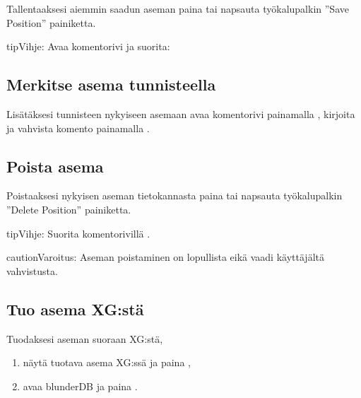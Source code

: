 \documentclass[letterpaper,10pt,finnish]{sphinxmanual}
\begin{document}
\sphinxAtStartPar
Tallentaaksesi aiemmin saadun aseman paina  tai napsauta työkalupalkin ”Save Position” \sphinxhyphen{}painiketta.

\begin{sphinxadmonition}{tip}{Vihje:}
\sphinxAtStartPar
Avaa komentorivi ja suorita: 
\end{sphinxadmonition}


\subsection{Merkitse asema tunnisteella}
\label{\detokenize{guide_utilisateur:etiqueter-une-position}}
\sphinxAtStartPar
Lisätäksesi tunnisteen  nykyiseen asemaan avaa komentorivi painamalla , kirjoita  ja vahvista komento painamalla .


\subsection{Poista asema}
\label{\detokenize{guide_utilisateur:supprimer-une-position}}
\sphinxAtStartPar
Poistaaksesi nykyisen aseman tietokannasta paina  tai napsauta työkalupalkin ”Delete Position” \sphinxhyphen{}painiketta.

\begin{sphinxadmonition}{tip}{Vihje:}
\sphinxAtStartPar
Suorita komentorivillä .
\end{sphinxadmonition}

\begin{sphinxadmonition}{caution}{Varoitus:}
\sphinxAtStartPar
Aseman poistaminen on lopullista eikä vaadi käyttäjältä vahvistusta.
\end{sphinxadmonition}


\subsection{Tuo asema XG:stä}
\label{\detokenize{guide_utilisateur:import-une-position-depuis-xg}}
\sphinxAtStartPar
Tuodaksesi aseman suoraan XG:stä,
\begin{enumerate}
%
\item {} 
\sphinxAtStartPar
näytä tuotava asema XG:ssä ja paina ,

\item {} 
\sphinxAtStartPar
avaa blunderDB ja paina .

\end{enumerate}
\end{document}
